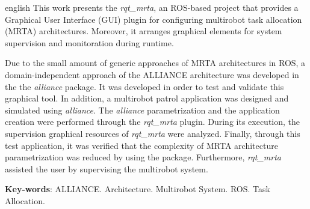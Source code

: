\begin{resumo}[Abstract]
    \begin{otherlanguage*}{english}
        This work presents the \textit{rqt\_mrta}, an ROS-based project that provides a Graphical User Interface (GUI) plugin for configuring multirobot task allocation (MRTA) architectures. Moreover, it arranges graphical elements for system supervision and monitoration during runtime. 
        
        Due to the small amount of generic approaches of MRTA architectures in ROS, a domain-independent approach of the ALLIANCE architecture was developed in the the \textit{alliance} package. It was developed in order to test and validate this graphical tool. In addition, a multirobot patrol application was designed and simulated using \textit{alliance}. The \textit{alliance} parametrization and the application creation were performed through the \textit{rqt\_mrta} plugin. During its execution, the supervision graphical resources of \textit{rqt\_mrta} were analyzed. Finally, through this test application, it was verified that the complexity of MRTA architecture parametrization was reduced by using the package. Furthermore, \textit{rqt\_mrta} assisted the user by supervising the multirobot system.
        
        \vspace{\onelineskip}
        
        \noindent 
        \textbf{Key-words}: ALLIANCE. Architecture. Multirobot System. ROS. Task Allocation. 
    \end{otherlanguage*}
\end{resumo}
\newpage